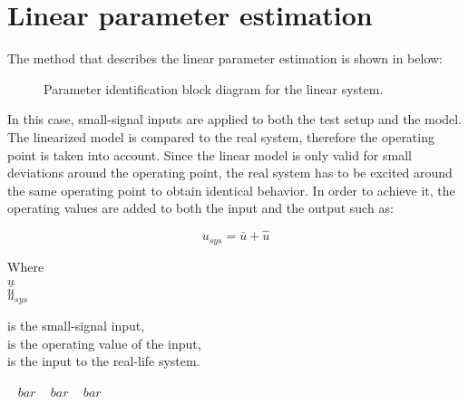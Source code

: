 \section{Linear parameter estimation} 
\label{LinParamEst}


The method that describes the linear parameter estimation is shown in  below:

\begin{figure}[H]
\centering
 
\caption{Parameter identification block diagram for the linear system. }
\label{fig:parame_block_lin}
\end{figure}

In this case, small-signal inputs are applied to both the test setup and the model. The linearized model is compared to the real system, therefore the operating point is taken into account. Since the linear model is only valid for small deviations around the operating point, the real system has to be excited around the same operating point to obtain identical behavior. In order to achieve it, the operating values are added to both the input and the output such as: 

\begin{equation}
u_{sys} = \bar{u} + \hat{u}
 \label{u_smallsignal}
\end{equation}

\begin{minipage}[t]{0.20\textwidth}
Where\\
\hspace*{8mm} $\hat{u}$ \\
\hspace*{8mm} $\bar{u}$ \\
\hspace*{8mm} $u_{sys}$ 
\end{minipage}
\begin{minipage}[t]{0.68\textwidth}
\vspace*{2mm}
is the small-signal input, \\
is the operating value of the input,\\
is the input to the real-life system. 
\end{minipage}
\begin{minipage}[t]{0.10\textwidth}
\vspace*{2mm}
\textcolor{White}{te}$\unit{bar}$
\textcolor{White}{te}$\unit{bar}$
\textcolor{White}{te}$\unit{bar}$
\end{minipage} 

